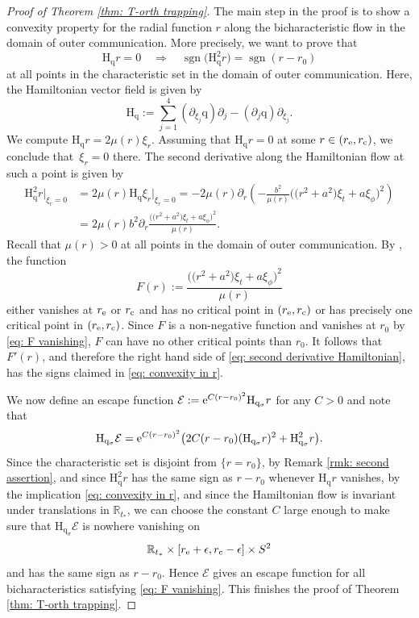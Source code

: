 \documentclass[pdftex]{sigma}
\newcommand{\e}{\epsilon}
\newcommand{\E}{\mathcal E}
\renewcommand{\d}{\partial}
\renewcommand{\H}{\mathrm H}
\renewcommand{\E}{\mathcal E}
\newcommand{\q}{\mathrm q}
\newcommand{\s}{\sigma}
\newcommand{\sgn}{\operatorname{sgn}}
\newcommand{\R}[0]{\mathbb{R}}
\numberwithin{equation}{section}
\begin{document}
\begin{proof}[Proof of Theorem \ref{thm: T-orth trapping}]
The main step in the proof is to show a convexity property for the radial function $r$ along the bicharacteristic flow in the domain of outer communication.
More precisely, we want to prove that
\begin{equation}\label{eq: convexity in r}
	\H_\q r
		= 0 \quad \Rightarrow \quad \sgn\big( \H_\q^2 r \big) = \sgn(r - r_0)
\end{equation}
at all points in the characteristic set in the domain of outer communication.
Here, the Hamiltonian vector field is given by
\[
	\H_{\q}
		:= \sum_{j = 1}^4 (\d_{\xi_j}\q)\d_j - (\d_j \q)\d_{\xi_j}.
\]
We compute $\H_{\q} r
		= 2 \mu(r) \xi_r$.
Assuming that $\H_{\q} r = 0$ at some $r \in (r_{\rm e}, r_{\rm c})$, we conclude that~${\xi_r = 0}$ there.
The second derivative along the Hamiltonian flow at such a point is given by
\begin{align}
	\H_{\q}^2 r|_{\xi_r = 0}
		&= 2 \mu(r) \H_{\q} \xi_r|_{\xi_r = 0} = - 2 \mu(r) \d_r \left( - \frac{b^2}{\mu(r)} \big( \big(r^2 + a^2\big) \xi_t + a \xi_\phi \big)^2 \right) \nonumber\\
		&= 2 \mu(r) b^2 \d_r \frac{\big( \big(r^2 + a^2\big) \xi_t + a \xi_\phi \big)^2}{\mu(r)}.\label{eq: second derivative Hamiltonian}
\end{align}
Recall that $\mu(r) > 0$ at all points in the domain of outer communication.
By \cite[Theorem~3.2\,(a)]{PV2023}, the function
\[
	F(r)
		:= \frac{\big( \big(r^2 + a^2\big) \xi_t + a \xi_\phi \big)^2}{\mu(r)}
\]
either vanishes at $r_{\rm e}$ or $r_{\rm c}$ and has no critical point in $(r_{\rm e}, r_{\rm c})$ or has precisely one critical point in $(r_{\rm e}, r_{\rm c})$.
Since $F$ is a non-negative function and vanishes at $r_0$ by \eqref{eq: F vanishing}, $F$ can have no other critical points than $r_0$.
It follows that $F'(r)$, and therefore the right hand side of \eqref{eq: second derivative Hamiltonian}, has the signs claimed in \eqref{eq: convexity in r}.

We now define an escape function $\E := {\rm e}^{C(r - r_0)^2}\H_{\q_\s} r$
for any $C > 0$ and note that
\[
	\H_{\q_\s} \E
		= {\rm e}^{C(r - r_0)^2} \big( 2 C(r - r_0) (\H_{\q_{\s}}r)^2 + \H_{\q_\s}^2 r \big).
\]
Since the characteristic set is disjoint from $\{r = r_0\}$, by Remark \ref{rmk: second assertion}, and since $\H_\q^2 r$ has the same sign as $r - r_0$ whenever $\H_\q r$ vanishes, by the implication \eqref{eq: convexity in r}, and since the Hamiltonian flow is invariant under translations in $\R_{t_*}$, we can choose the constant $C$ large enough to make sure that $\H_{\q_\s} \E$ is nowhere vanishing on
\[
	\R_{t_*} \times [r_{\rm e} + \e, r_{\rm c} - \e] \times S^2
\]
and has the same sign as $r - r_0$.
Hence $\E$ gives an escape function for all bicharacteristics satisfying \eqref{eq: F vanishing}.
This finishes the proof of Theorem \ref{thm: T-orth trapping}.
\end{proof}
\end{document}
